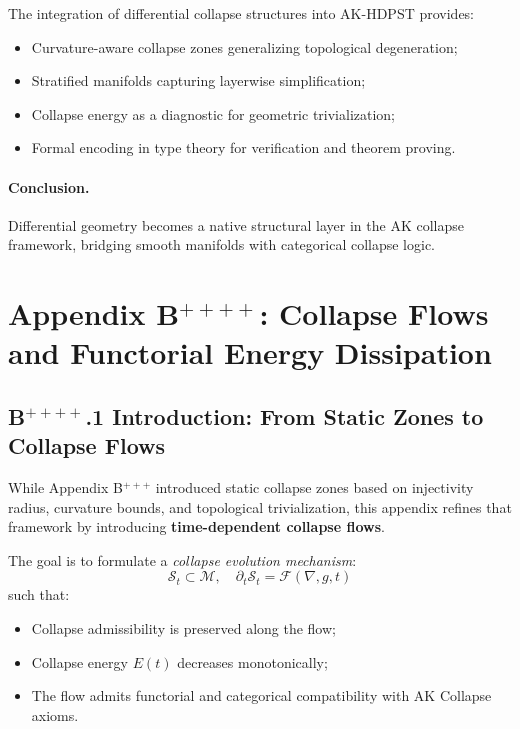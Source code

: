 \documentclass[11pt]{article}
\begin{document}
The integration of differential collapse structures into AK-HDPST provides:

\begin{itemize}
  \item Curvature-aware collapse zones generalizing topological degeneration;
  \item Stratified manifolds capturing layerwise simplification;
  \item Collapse energy as a diagnostic for geometric trivialization;
  \item Formal encoding in type theory for verification and theorem proving.
\end{itemize}

\paragraph{Conclusion.} Differential geometry becomes a native structural layer in the AK collapse framework, bridging smooth manifolds with categorical collapse logic.




\section*{Appendix B$^{++++}$: Collapse Flows and Functorial Energy Dissipation}

\subsection*{B$^{++++}$.1 Introduction: From Static Zones to Collapse Flows}

While Appendix B$^{+++}$ introduced static collapse zones based on injectivity radius, curvature bounds, and topological trivialization, this appendix refines that framework by introducing \textbf{time-dependent collapse flows}.

The goal is to formulate a \emph{collapse evolution mechanism}:
\[
\mathcal{S}_t \subset \mathcal{M},\quad \partial_t \mathcal{S}_t = \mathcal{F}(\nabla, g, t)
\]
such that:
\begin{itemize}
  \item Collapse admissibility is preserved along the flow;
  \item Collapse energy \( E(t) \) decreases monotonically;
  \item The flow admits functorial and categorical compatibility with AK Collapse axioms.
\end{itemize}
\end{document}
